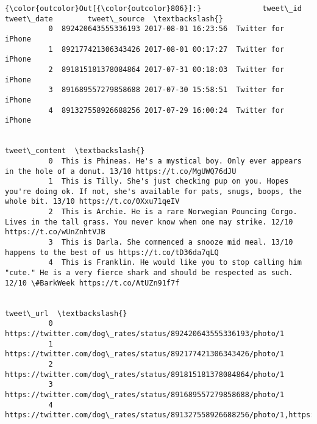 \documentclass[11pt]{article}
\begin{document}
\begin{Verbatim}[commandchars=\\\{\}]
{\color{outcolor}Out[{\color{outcolor}806}]:}              tweet\_id          tweet\_date        tweet\_source  \textbackslash{}
          0  892420643555336193 2017-08-01 16:23:56  Twitter for iPhone   
          1  892177421306343426 2017-08-01 00:17:27  Twitter for iPhone   
          2  891815181378084864 2017-07-31 00:18:03  Twitter for iPhone   
          3  891689557279858688 2017-07-30 15:58:51  Twitter for iPhone   
          4  891327558926688256 2017-07-29 16:00:24  Twitter for iPhone   
          
                                                                                                                                                                  tweet\_content  \textbackslash{}
          0  This is Phineas. He's a mystical boy. Only ever appears in the hole of a donut. 13/10 https://t.co/MgUWQ76dJU                                                        
          1  This is Tilly. She's just checking pup on you. Hopes you're doing ok. If not, she's available for pats, snugs, boops, the whole bit. 13/10 https://t.co/0Xxu71qeIV   
          2  This is Archie. He is a rare Norwegian Pouncing Corgo. Lives in the tall grass. You never know when one may strike. 12/10 https://t.co/wUnZnhtVJB                    
          3  This is Darla. She commenced a snooze mid meal. 13/10 happens to the best of us https://t.co/tD36da7qLQ                                                              
          4  This is Franklin. He would like you to stop calling him "cute." He is a very fierce shark and should be respected as such. 12/10 \#BarkWeek https://t.co/AtUZn91f7f   
          
                                                                                                                                   tweet\_url  \textbackslash{}
          0  https://twitter.com/dog\_rates/status/892420643555336193/photo/1                                                                   
          1  https://twitter.com/dog\_rates/status/892177421306343426/photo/1                                                                   
          2  https://twitter.com/dog\_rates/status/891815181378084864/photo/1                                                                   
          3  https://twitter.com/dog\_rates/status/891689557279858688/photo/1                                                                   
          4  https://twitter.com/dog\_rates/status/891327558926688256/photo/1,https://twitter.com/dog\_rates/status/891327558926688256/photo/1   
          

\end{Verbatim}
\end{document}

